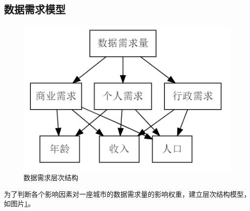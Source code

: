 \documentclass[UTF8,12pt]{ctexart}
\begin{document}
\subsection{数据需求模型}\label{ShuJv}
\begin{figure}[H]
    \centering
    \includegraphics{need.png}
    \caption{数据需求层次结构}\label{SJXQCCJG}
\end{figure}
为了判断各个影响因素对一座城市的数据需求量的影响权重，建立层次结构模型，如图片\ref{SJXQCCJG}。
\end{document}
